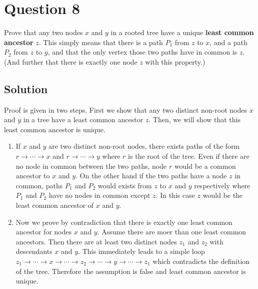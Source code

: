 
\section*{Question 8}

Prove that any two nodes $x$ and $y$ in a rooted tree have a unique \textbf{least common ancestor} $z$.
This simply means that there is a path $P_1$ from $z$ to $x$, and a path $P_2$ from $z$ to $y$, and that the only vertex those two paths have in common is $z$.
(And further that there is exactly one node $z$ with this property.)

\subsection*{Solution}

Proof is given in two steps.
First we show that any two distinct non-root nodes $x$ and $y$ in a tree have a least common ancestor $z$.
Then, we will show that this least common ancestor is unique.
\begin{enumerate}
\item[] If $x$ and $y$ are two distinct non-root nodes, there exists paths of the form $r \rightarrow \cdots \rightarrow x$ and $r \rightarrow \cdots \rightarrow y$ where $r$ is the root of the tree.
Even if there are no node in common between the two paths, node $r$ would be a common ancestor to $x$ and $y$.
On the other hand if the two paths have a node $z$ in common, paths $P_1$ and $P_2$ would exists from $z$ to $x$ and $y$ respectively where $P_1$ and $P_2$ have no nodes in common except $z$.
In this case $z$ would be the least common ancestor of $x$ and $y$.
\item[] Now we prove by contradiction that there is exactly one least common ancestor for nodes $x$ and $y$.
Assume there are moer than one least common ancestors.
Then there are at least two distinct nodes $z_1$ and $z_2$ with descendants $x$ and $y$.
This immediately leads to a simple loop $z_1 \rightarrow \cdots \rightarrow x \rightarrow \cdots \rightarrow z_2 \rightarrow \cdots \rightarrow y \rightarrow \cdots \rightarrow z_1$ which contradicts the definition of the tree.
Therefore the assumption is false and least common ancestor is unique.
\end{enumerate}
